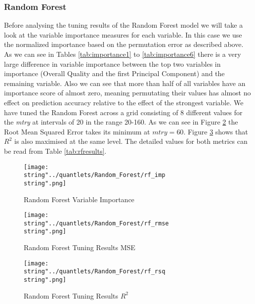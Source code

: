 \subsubsection{Random Forest}
Before analysing the tuning results of the Random Forest model we will take a look at the variable importance measures for each variable. In this case we use the normalized importance based on the permutation error as described above. As we can see in Tables \ref{tab:importance1} to \ref{tab:importance6} there is a very large difference in variable importance between the top two variables in importance (Overall Quality and the first Principal Component) and the remaining variable. Also we can see that more than half of all variables have an importance score of almost zero, meaning permutating their values has almost no effect on prediction accuracy relative to the effect of the strongest variable. 
We have tuned the Random Forest across a grid consisting of 8 different values for the \textit{mtry} at intervals of 20 in the range 20-160. As we can see in Figure \ref{fig:rf_rmse} the Root Mean Squared Error takes its minimum at $mtry = 60$. Figure \ref{fig:rf_rsq} shows that $R^2$ is also maximised at the same level. The detailed values for both metrics can be read from Table \ref{tab:rfresults}.







\begin{figure}
  \centering
\texttt{[image: \\string"../quantlets/Random\_Forest/rf\_imp\\string".png]}
  \caption{Random Forest Variable Importance}\label{fig:rf_imp}
\end{figure}

\begin{figure}
  \centering
\texttt{[image: \\string"../quantlets/Random\_Forest/rf\_rmse\\string".png]}
  \caption{Random Forest Tuning Results MSE}\label{fig:rf_rmse}
\end{figure}

\begin{figure}
  \centering
\texttt{[image: \\string"../quantlets/Random\_Forest/rf\_rsq\\string".png]}
  \caption{Random Forest Tuning Results $R^2$}\label{fig:rf_rsq}
\end{figure}